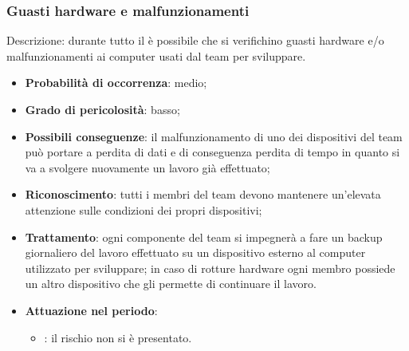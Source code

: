 \documentclass[PianoDiProgetto.tex]{subfiles}
\begin{document}
	\subsubsection{Guasti hardware e malfunzionamenti }
		\label{sec:ghs}
Descrizione: durante tutto il  è possibile che si verifichino guasti hardware e/o malfunzionamenti  ai computer usati dal team per sviluppare.
	\begin{itemize}
		\item \textbf{Probabilità di occorrenza}: medio;
		\item \textbf{Grado di pericolosità}: basso;
		\item \textbf{Possibili conseguenze}: il malfunzionamento di uno dei dispositivi del team può portare a perdita di dati e di conseguenza perdita di tempo in quanto si va a svolgere nuovamente un lavoro già effettuato;
		\item \textbf{Riconoscimento}: tutti i membri del team devono mantenere un'elevata attenzione sulle condizioni dei propri dispositivi;
		\item \textbf{Trattamento}: ogni componente del team si impegnerà a fare un backup giornaliero del lavoro effettuato su un dispositivo esterno al computer utilizzato per sviluppare; in caso di rotture hardware ogni membro possiede un altro dispositivo che gli permette di continuare il lavoro.
		\item \textbf{Attuazione nel periodo}: 
			\begin{itemize}
				\item \ARdoc : il rischio non si è presentato.
			\end{itemize}
	
	\end{itemize}
\end{document}
